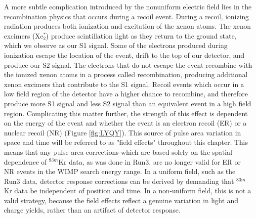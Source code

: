 A more subtle complication introduced by the nonuniform electric field lies in the recombination physics that occurs during a recoil event.  During a recoil, ionizing radiation produces both ionization and excitation of the xenon atoms.  The xenon excimers (Xe$_2^*$) produce scintillation light as they return to the ground state, which we observe as our S1 signal. Some of the electrons produced during ionization escape the location of the event, drift to the top of our detector, and produce our S2 signal.  The electrons that do not escape the event recombine with the ionized xenon atoms in a process called recombination, producing additional xenon excimers that contribute to the S1 signal.  Recoil events which occur in a low field region of the detector have a higher chance to recombine, and therefore produce more S1 signal and less S2 signal than an equivalent event in a high field region.  Complicating this matter further, the strength of this effect is dependent on the energy of the event and whether the event is an electron recoil (ER) or a nuclear recoil (NR) (Figure \ref{fig:LYQY}).  This source of pulse area variation in space and time will be referred to as "field effects" throughout this chapter.  This means that any pulse area corrections which are based solely on the spatial dependence of $^{83m}$Kr data, as was done in Run3, are no longer valid for ER or NR events in the WIMP search energy range.  In a uniform field, such as the Run3 data, detector response corrections can be derived by demanding that $^{83m}$Kr data be independent of position and time.  In a non-uniform field, this is not a valid strategy, because the field effects reflect a genuine variation in light and charge yields, rather than an artifact of detector response.

